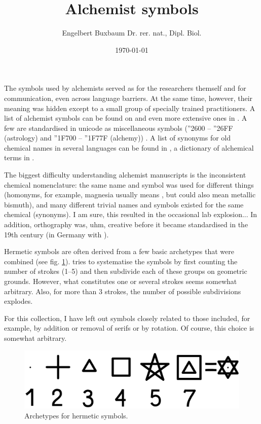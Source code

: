 \documentclass[british,final,landscape]{scrartcl}
\title{Alchemist symbols}
\author{Engelbert Buxbaum {\small Dr. rer. nat., Dipl. Biol.}}
\date{\today}
\begin{document}
\let\male\wasymale %
\let\female\wasyfemale

\begin{refsection}
\maketitle

The symbols used by alchemists served as  for the researchers themself and for communication, even across language barriers. At the same time, however, their meaning was hidden except to a small group of specially trained practitioners. A list of alchemist symbols can be found on \parencite{Sym-23} and even more extensive ones in \parencite{Ano-72, Get-81, Mar-20}. A few are standardised in unicode as miscellaneous symbols (''2600 -- ''26FF (astrology) and ''1F700 -- ''1F77F (alchemy)) \parencite{Uni-22}.  A list of synonyms for old chemical names in several languages can be found  in \parencite{Ant-62}, a dictionary of alchemical terms in \parencite{Rul-12}.

The biggest difficulty understanding alchemist manuscripts is the inconsistent chemical nomenclature: the same name and symbol was used for different things (homonyms, for example, magnesia usually means , but could also mean metallic bismuth), and many different trivial names and symbols existed for the same chemical (synonyms). I am sure, this resulted in the occasional lab explosion... In addition, orthography was, uhm, creative before it became standardised in the 19th century (in Germany with \parencite{Dud-80}).

Hermetic symbols are often derived from a few basic archetypes that were combined (see fig. \ref{fig:arche}).  \parencite[324--410]{Get-81} tries to systematise the symbols by first counting the number of strokes (1--5) and then subdivide each of these groups on geometric grounds. However, what constitutes one or several strokes seems somewhat arbitrary. Also, for more than 3 strokes, the number of possible subdivisions explodes.

For this collection, I have left out symbols closely related to those included, for example, by addition or removal of serifs or by rotation. Of course, this choice is somewhat arbitrary.

\begin{figure}
 \caption{\capstart Archetypes for hermetic symbols. }
 \label{fig:arche}
 \centering
 \includegraphics[width=0.3\columnwidth]{Concepts/Archetypes}
\end{figure}


\end{refsection}
\end{document}
